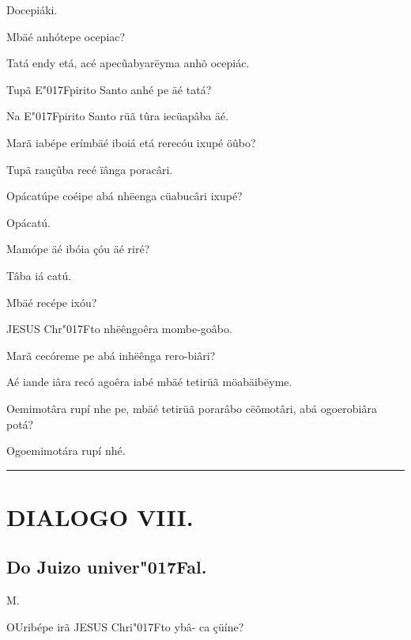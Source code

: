 \documentclass[openany,titlepage,12pt]{book}
\renewcommand{\chaptermark}[1]{\markboth{#1}{}}
\renewcommand{\sectionmark}[1]{\gdef\rightmark{#1}}
\newcommand{\lgS}{\char"017F}
\newcommand{\comecalista}[5]{
    \hspace*{-11.7pt}
    \begin{minipage}[t]{0.08\linewidth}
        \flushright #1\\#2
    \end{minipage}
    \hspace{0pt}
    \begin{minipage}[t]{0.94\linewidth}
        \lettrine
        [findent =2pt, nindent=0pt,  lines=2]
        {#3}{#4}#5
    \end{minipage}
    \vspace*{-3pt}
}
\begin{document}
\begin{altereven}
    \item Docepiáki.
    \item Mbäé anhótepe ocepiac?
    \item Tatá endy etá, acé apec\~uabyarëyma anhõ ocepiác.
    \item Tupã E\lgS pirito Santo anhé pe äé tatá?
    \item Na E\lgS pirito Santo rüã tûra iecüapâba äé.
    \item Marã iabépe erímbäé iboiá etá rerecóu ixupé öûbo?
    \item Tupã rauçûba recé ïânga poracâri.
    \item Opácatúpe coéipe abá nhëenga cüabucâri ixupé?
    \item Opácatú.
    \item Mamópe äé ibóia çóu äé riré?
    \item Tâba iá catú.
    \item Mbäé recépe ixóu?
    \item JESUS Chr\lgS to nhëêngoêra mombe-\linebreak goâbo.
    \item Marã cecóreme pe abá inhëênga rero-\linebreak biâri?
    \item Aé iande iâra recó agoêra iabé mbäé tetirüã
    möabäibëyme.
    \item Oemimotâra rupí nhe pe, mbäé tetirüã porarâbo
    cëõmotâri, abá ogoerobiâra potá?
    \item Ogoemimotára rupí nhé.
\end{altereven}

\vspace{2pt}
\par\noindent\rule{\textwidth}{0.4pt}
\unskip\vspace*{-3pt}
\section{DIALOGO VIII.}
\unskip\vspace{-5pt}
\subsection{Do Juizo univer\lgS al.}

\chaptermark{Dialogo VIII.}
\sectionmark{Do Juizo univer\lgS al.}
\vspace*{2pt}

\comecalista{M.}{}{O}{U}
    {ribépe irã JESUS Chri\lgS to ybâ-\linebreak
    ca çüíne?}
\end{document}
